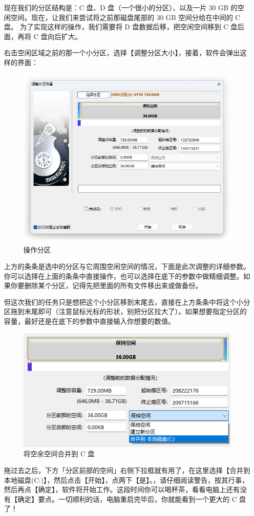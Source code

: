 {现在我们的分区结构是：C 盘、D 盘（一个很小的分区）、以及一片 30 GB 的空闲空间。现在，让我们来尝试将之前那磁盘尾部的 30 GB 空间分给在中间的 C 盘。
为了实现这样的操作，我们需要将 D 盘数据后移，把空闲空间移到 C 盘后面，再将 C 盘向后扩大。

右击空闲区域之前的那一个小分区，选择【调整分区大小】，接着，软件会弹出这样的界面：

\begin{figure}[htb!]
  \centering
  \includegraphics[width=.6\textwidth]{assets/advanced/Adjust_Part.png}
  \caption{操作分区}
  \label{fig:Adjust_Part}
\end{figure}

上方的条条是选中的分区与它周围空闲空间的情况，下面是此次调整的详细参数。你可以选择在上面的条条中直接操作，也可以选择在底下的参数中做精细调整。如果你要删除某个分区，记得先把里面的所有文件移出来或做备份。

但这次我们的任务只是想把这个小分区移到末尾去，直接在上方条条中将这个小分区拖到末尾即可（注意鼠标光标的形状，别把分区拉大了）。如果想要指定分区的容量，最好还是在底下的参数中直接输入你想要的数值。

\begin{figure}[htb!]
  \centering
  \includegraphics[width=.45\textwidth]{assets/advanced/Merge_To_C.png}
  \caption{将空余空间合并到 C 盘}
  \label{fig:Merge_To_C}
\end{figure}

拖过去之后，下方「分区前部的空间」右侧下拉框就有用了，在这里选择【合并到 本地磁盘(C:)】，然后点击【开始】，点两下【是】。，请仔细阅读警告，按其行事，然后再点【确定】，软件将开始工作。这段时间你可以喝杯茶，看看电脑上还有没有【确定】要点。一切顺利的话，电脑重启完毕后，你就能看到一个更大的 C 盘了！

}
